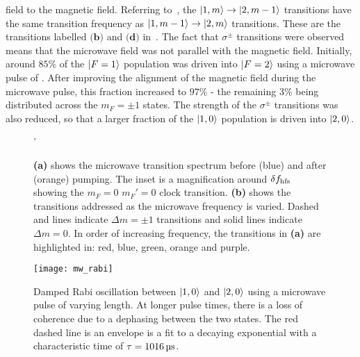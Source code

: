 field to the magnetic field. Referring
to~, the
$\ket{1,m}\rightarrow\ket{2,m-1}$
transitions have the same transition frequency as
$\ket{1,m-1}\rightarrow\ket{2,m}$
transitions. These are the transitions labelled $\textbf{(b)}$ and
$\textbf{(d)}$ in~. 
The fact that $\sigma^{\pm}$ transitions were observed means
that the microwave field was not parallel with the magnetic field.
Initially, around 
\(85\%\) of the $\ket{F=1}$ population was driven into \(\ket{F=2}\) using a
microwave pulse of . After improving the
alignment of the magnetic field during the microwave pulse, this
fraction increased to \(97\%\) - the remaining 3\% being distributed
across the \(m_F = \pm 1\) states. The strength of the $\sigma^{\pm}$
transitions was also reduced, so that a larger fraction of the
$\ket{1,0}$ population is driven into $\ket{2,0}$. 
\begin{figure}[!htbp]
    \centering
    \def\svgwidth{\columnwidth}
    \fontsize{14pt}{14pt}
    \subfloat[][]{\scalebox{0.5}{}\label{fig:microwave_spectrum}}
    \subfloat[][]{\scalebox{0.5}{\raisebox{4ex}{}}\label{fig:mw_spectrum_trans}}
    \caption[Microwave transition spectrum]{\textbf{(a)} shows the
      microwave transition spectrum before (blue) and after (orange)
     pumping. The inset is a magnification around $\delta
    f_\textnormal{hfs}$ showing the $m_F = 0$ \rightarrow $m_F' = 0$
    clock transition. \textbf{(b)} shows the transitions addressed
  as the microwave frequency is varied. Dashed and lines indicate
\(\Delta m = \pm 1\) transitions and solid lines indicate \(\Delta m =
0\). In order of increasing frequency, the transitions in \textbf{(a)} are highlighted in: red, blue, green, orange and purple.} 
    \label{fig:microwave_data}'
\end{figure}
\begin{figure}[!htbp]
    \centering
    \texttt{[image: mw\_rabi]}
    \caption[Microwave Rabi oscillation between \(\ket{1,0}\) and \(\ket{2,0}\)]{Damped Rabi oscillation between \(\ket{1,0}\) and \(\ket{2,0}\) using a microwave pulse of varying length. At longer pulse times, there is a loss of coherence due to a dephasing between the two states. The red dashed line is an envelope is a fit to a decaying exponential with a characteristic time of \(\tau = \sivalue{1016}{\micro\second}\).}
    \label{fig:mw_rabi}
\end{figure}

